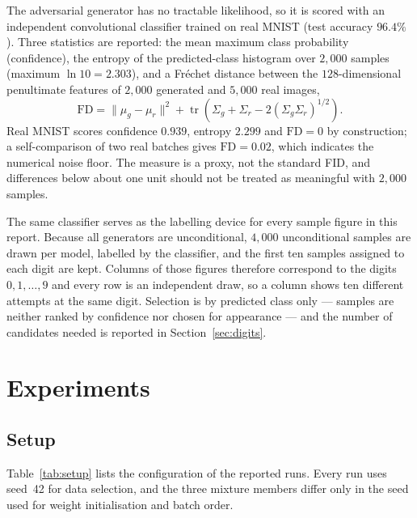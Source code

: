 \documentclass[11pt,a4paper]{article}
\begin{document}
The adversarial generator has no tractable likelihood, so it is scored with an independent
convolutional classifier trained on real MNIST (test accuracy $96.4\%$). Three statistics are
reported: the mean maximum class probability (confidence), the entropy of the predicted-class
histogram over $2{,}000$ samples (maximum $\ln 10 = 2.303$), and a Fr\'echet distance between
the $128$-dimensional penultimate features of $2{,}000$ generated and $5{,}000$ real images,
\begin{equation}
  \mathrm{FD} = \lVert \mu_g - \mu_r \rVert^2 + \operatorname{tr}\!\left(\Sigma_g + \Sigma_r - 2(\Sigma_g\Sigma_r)^{1/2}\right).
  \label{eq:fd}
\end{equation}
Real MNIST scores confidence $0.939$, entropy $2.299$ and $\mathrm{FD}=0$ by construction; a
self-comparison of two real batches gives $\mathrm{FD}=0.02$, which indicates the numerical
noise floor. The measure is a proxy, not the standard FID, and differences below about one
unit should not be treated as meaningful with $2{,}000$ samples.

The same classifier serves as the labelling device for every sample figure in this report.
Because all generators are unconditional, $4{,}000$ unconditional samples are drawn per model,
labelled by the classifier, and the first ten samples assigned to each digit are kept.
Columns of those figures therefore correspond to the digits $0,1,\dots,9$ and every row is an
independent draw, so a column shows ten different attempts at the same digit.
Selection is by predicted class only --- samples are neither ranked by confidence nor chosen
for appearance --- and the number of candidates needed is reported in
Section~\ref{sec:digits}.

\section{Experiments}
\label{sec:experiments}

\subsection{Setup}

Table~\ref{tab:setup} lists the configuration of the reported runs. Every run uses seed~42
for data selection, and the three mixture members differ only in the seed used for weight
initialisation and batch order.
\end{document}
